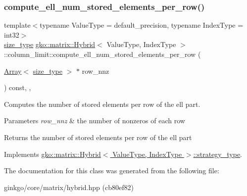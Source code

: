 \subsubsection{\texorpdfstring{compute\+\_\+ell\+\_\+num\+\_\+stored\+\_\+elements\+\_\+per\+\_\+row()}{compute\_ell\_num\_stored\_elements\_per\_row()}}
{\footnotesize\ttfamily template$<$typename Value\+Type = default\+\_\+precision, typename Index\+Type = int32$>$ \\
\hyperlink{namespacegko_a6e5c95df0ae4e47aab2f604a22d98ee7}{size\+\_\+type} \hyperlink{classgko_1_1matrix_1_1Hybrid}{gko\+::matrix\+::\+Hybrid}$<$ Value\+Type, Index\+Type $>$\+::column\+\_\+limit\+::compute\+\_\+ell\+\_\+num\+\_\+stored\+\_\+elements\+\_\+per\+\_\+row (\begin{DoxyParamCaption}\item[{\hyperlink{classgko_1_1Array}{Array}$<$ \hyperlink{namespacegko_a6e5c95df0ae4e47aab2f604a22d98ee7}{size\+\_\+type} $>$ $\ast$}]{row\+\_\+nnz }\end{DoxyParamCaption}) const\hspace{0.3cm}{\ttfamily [inline]}, {\ttfamily [override]}, {\ttfamily [virtual]}}



Computes the number of stored elements per row of the ell part. 


\begin{DoxyParams}{Parameters}
{\em row\+\_\+nnz} & the number of nonzeros of each row\\
\hline
\end{DoxyParams}
\begin{DoxyReturn}{Returns}
the number of stored elements per row of the ell part 
\end{DoxyReturn}


Implements \hyperlink{classgko_1_1matrix_1_1Hybrid_1_1strategy__type_a0a0cd4024f27c7d0f286f35fc0a6de60}{gko\+::matrix\+::\+Hybrid$<$ Value\+Type, Index\+Type $>$\+::strategy\+\_\+type}.



The documentation for this class was generated from the following file\+:\begin{DoxyCompactItemize}
\item 
ginkgo/core/matrix/hybrid.\+hpp (cb80ef82)\end{DoxyCompactItemize}
